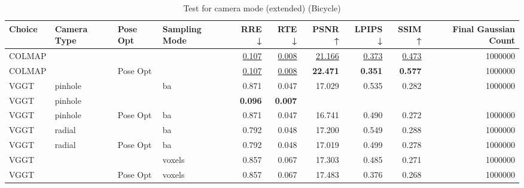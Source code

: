 \begin{table}[H]
\caption{Test for camera mode (extended) (Bicycle)}
\label{tab:10_camera_type_ext_bicycle}
\begin{tabular}{llllrrrrrr}
\toprule
Choice & Camera Type & Pose Opt & Sampling Mode & RRE ↓ & RTE ↓ & PSNR ↑ & LPIPS ↓ & SSIM ↑ & Final Gaussian Count \\
\midrule
COLMAP &  &  &  & \underline{0.107} & \underline{0.008} & \underline{21.166} & \underline{0.373} & \underline{0.473} & 1000000 \\
COLMAP &  & Pose Opt &  & \underline{0.107} & \underline{0.008} & \textbf{22.471} & \textbf{0.351} & \textbf{0.577} & 1000000 \\
VGGT & pinhole &  & ba & 0.871 & 0.047 & 17.029 & 0.535 & 0.282 & 1000000 \\
VGGT & pinhole &  &  & \textbf{0.096} & \textbf{0.007} &  &  &  &  \\
VGGT & pinhole & Pose Opt & ba & 0.871 & 0.047 & 16.741 & 0.490 & 0.272 & 1000000 \\
VGGT & radial &  & ba & 0.792 & 0.048 & 17.200 & 0.549 & 0.288 & 1000000 \\
VGGT & radial & Pose Opt & ba & 0.792 & 0.048 & 17.019 & 0.499 & 0.278 & 1000000 \\
VGGT &  &  & voxels & 0.857 & 0.067 & 17.303 & 0.485 & 0.271 & 1000000 \\
VGGT &  & Pose Opt & voxels & 0.857 & 0.067 & 17.483 & 0.376 & 0.268 & 1000000 \\
\bottomrule
\end{tabular}
\end{table}
